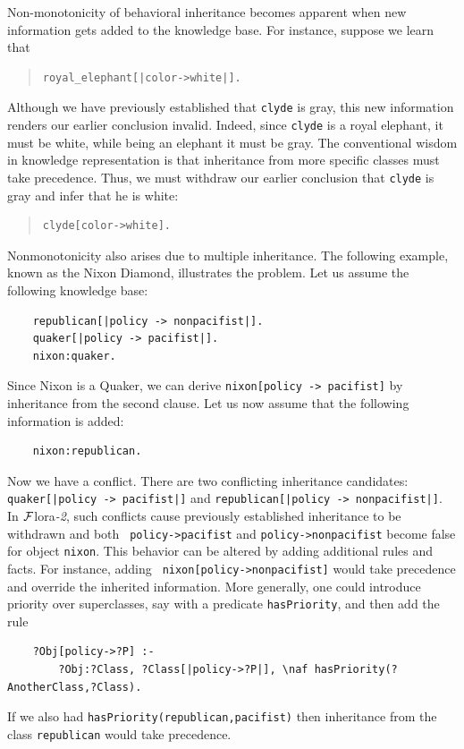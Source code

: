 \documentclass[11pt]{article}
\newcommand{\FLORA}{{\mbox{\sc ${\cal F}${lora}\rm\emph{-2}}}\xspace}
\newcommand{\FLSYSTEM}{\FLORA}
\begin{document}
Non-monotonicity of behavioral inheritance becomes apparent when new
information gets added to the knowledge base. For instance, suppose we
learn that
\begin{quote}
\begin{verbatim}
royal_elephant[|color->white|].  
\end{verbatim}
\end{quote}
Although we have previously established that {\tt clyde} is gray, this
new information renders our earlier conclusion invalid. Indeed, since
{\tt clyde} is a royal elephant, it must be white, while being an
elephant it must be gray.  The conventional wisdom in knowledge
representation is that inheritance from more specific classes
must take precedence. Thus, we must withdraw our earlier conclusion
that {\tt clyde} is gray and infer that he is white:
\begin{quote}
\begin{verbatim}
clyde[color->white].    
\end{verbatim}
\end{quote}

Nonmonotonicity also arises due to multiple inheritance. The following
example, known as the Nixon Diamond, illustrates the problem. Let us assume
the following knowledge base:
\begin{verbatim}
    republican[|policy -> nonpacifist|].
    quaker[|policy -> pacifist|].
    nixon:quaker.
\end{verbatim}
Since Nixon is a Quaker, we can derive {\tt nixon[policy -> pacifist]}
by inheritance from the second clause. Let us now assume that the following
information is added:
\begin{verbatim}
    nixon:republican.  
\end{verbatim}
Now we have a conflict. There are two conflicting inheritance candidates:
{\tt quaker[|policy -> pacifist|]} and {\tt republican[|policy ->
  nonpacifist|]}.  In \FLSYSTEM, such conflicts cause previously
established inheritance to be withdrawn and both {\tt
  policy->pacifist} and \texttt{policy->nonpacifist} 
become false for object {\tt nixon}.  This behavior can be
altered by adding additional rules and facts. For instance, adding {\tt
  nixon[policy->nonpacifist]} would take precedence and override the
inherited information. More generally, one could introduce priority over
superclasses, say with a predicate {\tt hasPriority}, and then add the rule
\begin{verbatim}
    ?Obj[policy->?P] :-
        ?Obj:?Class, ?Class[|policy->?P|], \naf hasPriority(?AnotherClass,?Class).
\end{verbatim}
If we also had {\tt hasPriority(republican,pacifist)} then inheritance from
the class {\tt republican} would take precedence. 
\end{document}
